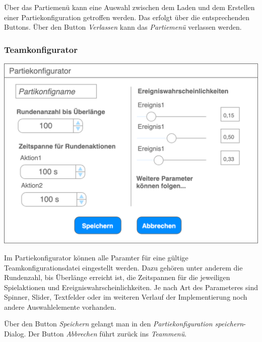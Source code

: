 \documentclass[a4paper,12pt,
headsepline,           %
oneside,               %
pointlessnumbers,      %
bibtotoc,              %
]{scrartcl}
\begin{document}
	Über das Partiemenü kann eine Auswahl zwischen dem Laden und dem Erstellen einer Partiekonfiguration getroffen werden. Das erfolgt über die entsprechenden Buttons. Über den Button \textit{Verlassen} kann das \textit{Partiemenü} verlassen werden.
	
	\subsubsection{Teamkonfigurator}
	
	\includegraphics[scale=0.4]{images/partiekonfigurator}
	
	Im Partiekonfigurator können alle Paramter für eine gültige Teamkonfigurationsdatei eingestellt werden. Dazu gehören unter anderem die Rundenzahl, bis Überlänge erreicht ist, die Zeitspannen für die jeweiligen Spielaktionen und Ereigniswahrscheinlichkeiten. Je nach Art des Parameteres sind Spinner, Slider, Textfelder oder im weiteren Verlauf der Implementierung noch andere Auswahlelemente vorhanden.
	
	Über den Button \textit{Speichern} gelangt man in den \textit{Partiekonfiguration speichern}-Dialog. Der Button \textit{Abbrechen} führt zurück ins \textit{Teammenü}.
	
   
\end{document}
